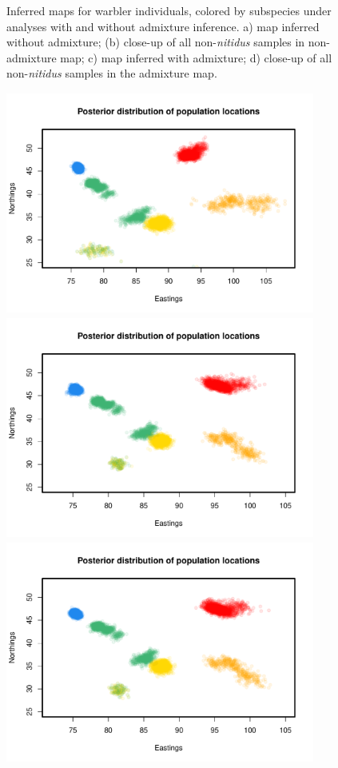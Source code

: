 \documentclass[10pt,letterpaper]{article}
\begin{document}
\begin{figure}
	\caption{
    Inferred maps for warbler individuals, colored by subspecies under analyses with and without admixture inference. a) map inferred without admixture; (b) close-up of all non-\textit{nitidus} samples in non-admixture map; c) map inferred with admixture; d) close-up of all non-\textit{nitidus} samples in the admixture map.}\label{sfig:warbler_ind_maps_compare}
\end{figure}

\begin{figure}
	\centering
			{\includegraphics[width=4in,height=2.88in]{../figs/warblers/warb_inds_ad_post_map_randpr2.pdf}}
			{\includegraphics[width=4in,height=2.88in]{../figs/warblers/warb_inds_ad_post_map_realpr1.pdf}}
			{\includegraphics[width=4in,height=2.88in]{../figs/warblers/warb_inds_ad_post_map_realpr2.pdf}}

\end{figure}
\end{document}
